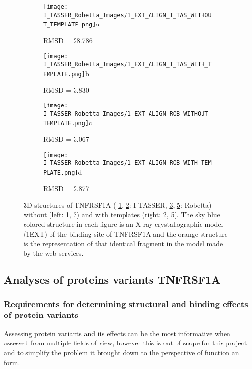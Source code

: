 	\begin{figure}[!ht]
		\centering
		\begin{subfigure}{0.45\textwidth}
			\texttt{[image: I\_TASSER\_Robetta\_Images/1\_EXT\_ALIGN\_I\_TAS\_WITHOUT\_TEMPLATE.png]}{a}
			\caption{RMSD = 28.786}
			\label{fig:RES_I_TASSER_Without}
		\end{subfigure}
		\begin{subfigure}{0.45\textwidth}
			\texttt{[image: I\_TASSER\_Robetta\_Images/1\_EXT\_ALIGN\_I\_TAS\_WITH\_TEMPLATE.png]}{b}
			\caption{RMSD =  3.830}
			\label{fig:RES_I_TASSER_With}
		\end{subfigure}
		\begin{subfigure}{0.45\textwidth}
			\texttt{[image: I\_TASSER\_Robetta\_Images/1\_EXT\_ALIGN\_ROB\_WITHOUT\_TEMPLATE.png]}{c}
			\caption{RMSD =  3.067}
			\label{fig:RES_Robetta_Without}
		\end{subfigure}
		\begin{subfigure}{0.45\textwidth}
			\texttt{[image: I\_TASSER\_Robetta\_Images/1\_EXT\_ALIGN\_ROB\_WITH\_TEMPLATE.png]}{d}
			\caption{RMSD =  2.877}
			\label{fig:RES_Robetta_With}
		\end{subfigure}
		\caption[I-TASSER and Robetta models with and without templates]{3D structures of TNFRSF1A ( \ref{fig:RES_I_TASSER_Without}, \ref{fig:RES_I_TASSER_With}: I-TASSER, \ref{fig:RES_Robetta_Without}, \ref{fig:RES_Robetta_With}: Robetta) without (left: \ref{fig:RES_I_TASSER_Without}, \ref{fig:RES_Robetta_Without}) and with templates (right: \ref{fig:RES_I_TASSER_With}, \ref{fig:RES_Robetta_With}). The sky blue colored structure in each figure is an X-ray crystallographic model (1EXT) of the binding site of TNFRSF1A and the orange structure is the representation of that identical fragment in the model made by the web services.}
	\end{figure}
	\label{subsubsec:RES_Expanding_Models}

\newpage
\subsection{Analyses of proteins variants TNFRSF1A}
	\subsubsection{Requirements for determining structural and binding effects of protein variants}
	Assessing protein variants and its effects can be the most informative when assessed from multiple fields of view, however this is out of scope for this project and to simplify the problem it brought down to the perspective of function an form.
	
